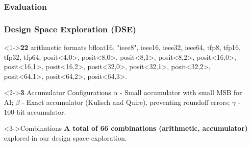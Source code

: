 \subsubsection{Evaluation}
%
%


\begin{frame}
    \frametitle{Design Space Exploration (DSE)}

	\begin{alertblock}<1->{\textbf{22} arithmetic formats}
	bfloat16, "ieee8", ieee16, ieee32, ieee64, tfp8, tfp16, tfp32, tfp64, posit<4,0>, posit<8,0>, posit<8,1>, posit<8,2>, posit<16,0>, posit<16,1>, posit<16,2>, posit<32,0>, posit<32,1>, posit<32,2>, posit<64,1>, posit<64,2>, posit<64,3>.
    \end{alertblock}

	\begin{alertblock}<2->{\textbf{3} Accumulator Configurations}
        $\alpha$ - Small accumulator with small MSB for AI; $\beta$ - Exact accumulator (Kulisch and Quire), preventing roundoff errors; $\gamma$ - 100-bit accumulator.
    \end{alertblock}

    \begin{block}<3->{Combinations}
        \textbf{A total of \textbf{66} combinations (arithmetic, accumulator)} explored in our design space exploration.
    \end{block}
\end{frame}

